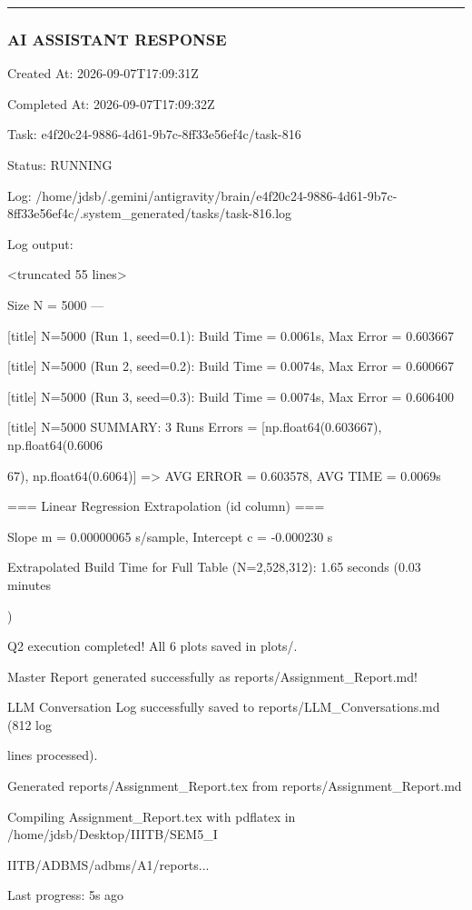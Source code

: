 \documentclass[11pt,a4paper]{article}
\begin{document}
\hrule

\subsubsection{AI ASSISTANT RESPONSE}

Created At: 2026-09-07T17:09:31Z

Completed At: 2026-09-07T17:09:32Z

Task: e4f20c24-9886-4d61-9b7c-8ff33e56ef4c/task-816

Status: RUNNING

Log: /home/jdsb/.gemini/antigravity/brain/e4f20c24-9886-4d61-9b7c-8ff33e56ef4c/.system\_generated/tasks/task-816.log

Log output:

<truncated 55 lines>

Size N = 5000 ---

[title] N=5000 (Run 1, seed=0.1): Build Time = 0.0061s, Max Error = 0.603667

[title] N=5000 (Run 2, seed=0.2): Build Time = 0.0074s, Max Error = 0.600667

[title] N=5000 (Run 3, seed=0.3): Build Time = 0.0074s, Max Error = 0.606400

[title] N=5000 SUMMARY: 3 Runs Errors = [np.float64(0.603667), np.float64(0.6006

67), np.float64(0.6064)] => AVG ERROR = 0.603578, AVG TIME = 0.0069s

=== Linear Regression Extrapolation (id column) ===

Slope m = 0.00000065 s/sample, Intercept c = -0.000230 s

Extrapolated Build Time for Full Table (N=2,528,312): 1.65 seconds (0.03 minutes

)

Q2 execution completed! All 6 plots saved in plots/.

Master Report generated successfully as reports/Assignment\_Report.md!

LLM Conversation Log successfully saved to reports/LLM\_Conversations.md (812 log

lines processed).

Generated reports/Assignment\_Report.tex from reports/Assignment\_Report.md

Compiling Assignment\_Report.tex with pdflatex in /home/jdsb/Desktop/IIITB/SEM5\_I

IITB/ADBMS/adbms/A1/reports...


Last progress: 5s ago
\end{document}
